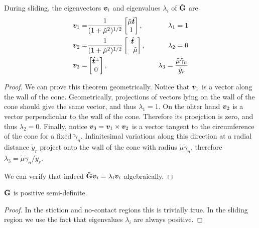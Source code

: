 
\begin{theorem}
During sliding, the eigenvectors ${\bm{v}}_i$ and eigenvalues $\lambda_i$ of $\tilde{{\mathbf{G}}}$ are
\begin{eqnarray}
	\vf{v}_1 =& \frac{1}{(1+\tilde\mu^2)^{1/2}}
	\begin{bmatrix}
		\tilde\mu\sthat\\
		1
	\end{bmatrix},&\quad\lambda_1 = 1\nonumber\\
	\vf{v}_2 =& \frac{1}{(1+\tilde\mu^2)^{1/2}}
	\begin{bmatrix}
		\sthat\\
		-\tilde\mu
	\end{bmatrix},&\quad\lambda_2 = 0\nonumber\\
	\vf{v}_3 =& 
	\begin{bmatrix}
		\sthat^\perp\\
		0
	\end{bmatrix},&\quad\lambda_3 = \frac{\tilde\mu\tilde\gamma_n}{\tilde{y}_r}
	\label{eq:Gtilde_eigenvectors}
\end{eqnarray}
\end{theorem}
\begin{proof}
We can prove this theorem geometrically. Notice that ${\bm{v}}_1$ is a vector along the wall of the cone. Geometrically, projections of vectors lying on the wall of the cone should give the same vector, and thus $\lambda_1=1$. On the ohter hand ${\bm{v}}_2$ is a vector perpendicular to the wall of the cone. Therefore its proejction is zero, and thus $\lambda_2=0$. Finally, notice ${\bm{v}}_3 = {\bm{v}}_1\times{\bm{v}}_2$ is a vector tangent to the circumference of the cone for a fixed $\tilde\gamma_n$. Infinitesimal variations along this direction at a radial distance $\tilde{y}_r$ project onto the wall of the cone with radius $\tilde\mu\tilde\gamma_n$, therefore $\lambda_3=\tilde\mu\tilde\gamma_n/\tilde{y}_r$.

We can verify that indeed $\tilde{{\mathbf{G}}}{\bm{v}}_i=\lambda_i{\bm{v}}_i$ algebraically.
\end{proof}
\begin{corollary}
$\tilde{{\mathbf{G}}}$ is positive semi-definite.
\end{corollary}
\begin{proof}
In the stiction and no-contact regions this is trivially true. In the sliding region we use the fact that eigenvalues $\lambda_i$ are always positive.
\end{proof}

